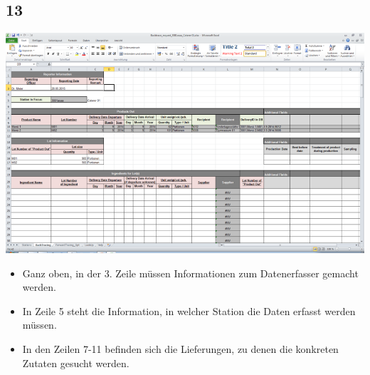 \documentclass{beamer}
\begin{document}
\subsection{13}
\begin{frame}
	\begin{center}
  		\includegraphics[height=0.65\textheight]{13.png}
	\end{center}
	\begin{itemize}
		\item Ganz oben, in der 3. Zeile müssen Informationen zum Datenerfasser gemacht werden.
		\item In Zeile 5 steht die Information, in welcher Station die Daten erfasst werden müssen.
		\item In den Zeilen 7-11 befinden sich die Lieferungen, zu denen die konkreten Zutaten gesucht werden.
	\end{itemize}
\end{frame}
\end{document}
